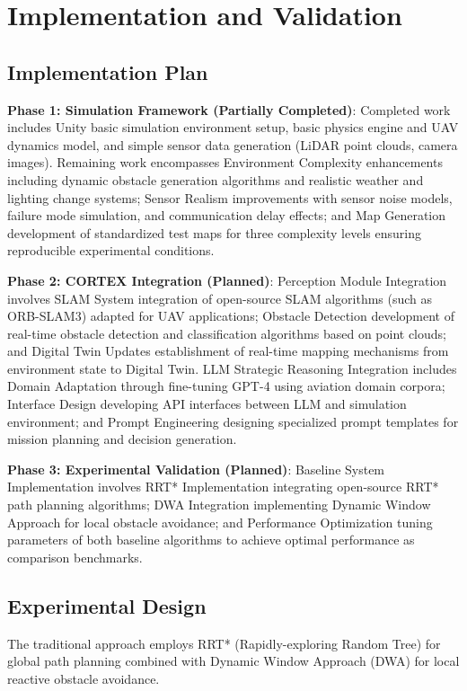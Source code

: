 \section{Implementation and Validation}

\subsection{Implementation Plan}

\textbf{Phase 1: Simulation Framework (Partially Completed)}: Completed work includes Unity basic simulation environment setup, basic physics engine and UAV dynamics model, and simple sensor data generation (LiDAR point clouds, camera images). Remaining work encompasses Environment Complexity enhancements including dynamic obstacle generation algorithms and realistic weather and lighting change systems; Sensor Realism improvements with sensor noise models, failure mode simulation, and communication delay effects; and Map Generation development of standardized test maps for three complexity levels ensuring reproducible experimental conditions.

\textbf{Phase 2: CORTEX Integration (Planned)}: Perception Module Integration involves SLAM System integration of open-source SLAM algorithms (such as ORB-SLAM3) adapted for UAV applications; Obstacle Detection development of real-time obstacle detection and classification algorithms based on point clouds; and Digital Twin Updates establishment of real-time mapping mechanisms from environment state to Digital Twin. LLM Strategic Reasoning Integration includes Domain Adaptation through fine-tuning GPT-4 using aviation domain corpora; Interface Design developing API interfaces between LLM and simulation environment; and Prompt Engineering designing specialized prompt templates for mission planning and decision generation.

\textbf{Phase 3: Experimental Validation (Planned)}: Baseline System Implementation involves RRT* Implementation integrating open-source RRT* path planning algorithms; DWA Integration implementing Dynamic Window Approach for local obstacle avoidance; and Performance Optimization tuning parameters of both baseline algorithms to achieve optimal performance as comparison benchmarks.

\subsection{Experimental Design}

The traditional approach employs RRT* (Rapidly-exploring Random Tree) for global path planning combined with Dynamic Window Approach (DWA) for local reactive obstacle avoidance.

